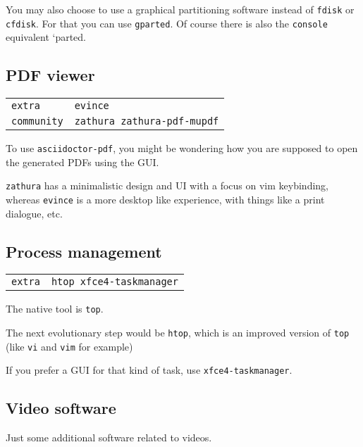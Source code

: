 \documentclass[9pt]{report}
\newenvironment{packagetable}
{\begin{longtabu}to \textwidth [b]{X[1,r]|X[1,l]}}
{\end{longtabu}}
\begin{document}
You may also choose to use a graphical partitioning software instead of \texttt{fdisk} or \texttt{cfdisk}.
For that you can use \texttt{gparted}.
Of course there is also the \texttt{console} equivalent `parted.



\newpage

\hypertarget{x-pdf-viewer}{\subsection{PDF viewer}}
\begin{packagetable}
    \texttt{extra} & \texttt{evince} \\ 
    \texttt{community} & \texttt{zathura zathura-pdf-mupdf} \\ 
\end{packagetable}

To use \texttt{asciidoctor-pdf}, you might be wondering how you are supposed to open the generated PDFs using the GUI.


\texttt{zathura} has a minimalistic design and UI with a focus on vim keybinding, whereas \texttt{evince} is a more desktop like experience, with things like a print dialogue, etc.



\newpage

\hypertarget{x-process-management}{\subsection{Process management}}
\begin{packagetable}
    \texttt{extra} & \texttt{htop xfce4-taskmanager} \\ 
\end{packagetable}

The native tool is \texttt{top}.


The next evolutionary step would be \texttt{htop}, which is an improved version of \texttt{top} (like \texttt{vi} and \texttt{vim} for example)


If you prefer a GUI for that kind of task, use \texttt{xfce4-taskmanager}.



\newpage

\hypertarget{x-video-software}{\subsection{Video software}}
Just some additional software related to videos.
\end{document}
